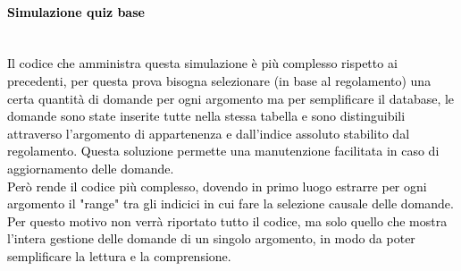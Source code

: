 \paragraph{\textcolor{black}{Simulazione quiz base}}\leavevmode\\
\textcolor{black}{Il codice che amministra questa simulazione è più complesso rispetto ai precedenti, per questa prova bisogna selezionare (in base al regolamento) una certa quantità di domande per ogni argomento ma per semplificare il database, le domande sono state inserite tutte nella stessa tabella e sono distinguibili attraverso l'argomento di appartenenza e dall'indice assoluto stabilito dal regolamento. Questa soluzione permette una manutenzione facilitata in caso di aggiornamento delle domande.\\
Però rende il codice più complesso, dovendo in primo luogo estrarre per ogni argomento il "range" tra gli indicici in cui fare la selezione causale delle domande.\\
Per questo motivo non verrà riportato tutto il codice, ma solo quello che mostra l'intera gestione delle domande di un singolo argomento, in modo da poter semplificare la lettura e la comprensione.}\\

